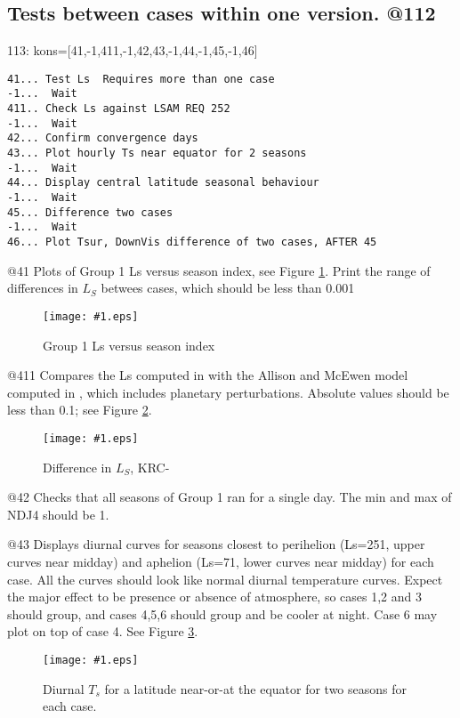 \documentclass{article}  %
\newcommand{\igc}[1]{\texttt{[image: \#1.eps]}}
\begin{document}
\subsection{Tests between cases within one version. @112 \label{a112}} %

113: kons=[41,-1,411,-1,42,43,-1,44,-1,45,-1,46] 
\vspace{-3.mm} 
\begin{verbatim}
41... Test Ls  Requires more than one case
-1...  Wait
411.. Check Ls against LSAM REQ 252
-1...  Wait
42... Confirm convergence days 
43... Plot hourly Ts near equator for 2 seasons
-1...  Wait
44... Display central latitude seasonal behaviour
-1...  Wait
45... Difference two cases
-1...  Wait
46... Plot Tsur, DownVis difference of two cases, AFTER 45 
\end{verbatim}

@41 Plots of Group 1 Ls versus season index, see Figure \ref{p41}.  Print the
range of differences in $L_S$ betwees cases, which should be less than 0.001

\begin{figure}[!ht] \igc{p41}
\caption[Ls] {Group 1 Ls versus season index
\label{p41} } \end{figure}

@411 Compares the Ls computed in  with the Allison and McEwen model computed in , which includes planetary perturbations.  Absolute values should be less than 0.1; see Figure \ref{p411}. 

\begin{figure}[!ht] \igc{p411}
\caption[Ls difference] {Difference in $L_S$, KRC- 
\label{p411} } \end{figure}

@42 Checks that all seasons of Group 1 ran for a single day. The min and max of
NDJ4 should be 1.

@43 Displays diurnal curves for seasons closest to perihelion (Ls=251, upper
curves near midday) and aphelion (Ls=71, lower curves near midday) for each
case. All the curves should look like normal diurnal temperature curves. Expect
the major effect to be presence or absence of atmosphere, so cases 1,2 and 3
should group, and cases 4,5,6 should group and be cooler at night. Case 6 may
plot on top of case 4.  See Figure \ref{p43}. 

\begin{figure}[!ht] \igc{p43}
\caption[Ts versus Hour] { Diurnal $T_s$ for a latitude near-or-at the equator for two seasons for each case.
\label{p43} } \end{figure}
\end{document}
